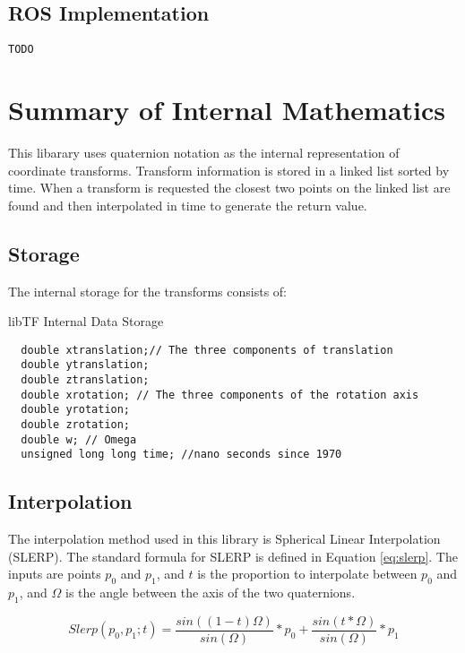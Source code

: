 \documentclass[12pt]{article}
\newcommand{\todo}[1]{\vspace{3 mm}\par \noindent {\textsc{ToDo}}\framebox{
\begin{minipage}[c]{1.0\hsize}\tt #1 \end{minipage}}\vspace{3mm}\par}
\begin{document}
\subsection{ROS Implementation}
\begin{verbatim}
TODO
\end{verbatim}

\section{Summary of Internal Mathematics}
This libarary uses quaternion notation as the internal representation
of coordinate transforms.  Transform information is stored in a linked 
list sorted by time.  When a transform is requested the closest two points 
on the linked list are found and then interpolated in time to generate the 
return value.  

\subsection{Storage}
The internal storage for the transforms consists of:
\begin{struct}[H]
\caption{libTF Internal Data Storage}
\begin{verbatim}
  double xtranslation;// The three components of translation
  double ytranslation;
  double ztranslation;
  double xrotation; // The three components of the rotation axis
  double yrotation;
  double zrotation;
  double w; // Omega
  unsigned long long time; //nano seconds since 1970
\end{verbatim}
\end{struct}


\subsection{Interpolation}
The interpolation method used in this library is Spherical Linear Interpolation
(SLERP).  The standard formula for SLERP is defined in Equation \ref{eq:slerp}.
The inputs are points $p_0$ and $p_1$, and $t$ is the proportion to interpolate 
between $p_0$ and $p_1$, and $\Omega$ is the angle between the axis of the two quaternions. 

\begin{equation}
Slerp(p_0,p_1;t) = \frac{sin((1-t)\Omega)}{sin(\Omega)} * p_0 + \frac{sin(t*\Omega)}{sin(\Omega)} * p_1
\label{eq:slerp}
\end{equation}

\todo{add graphic}
\end{document}
